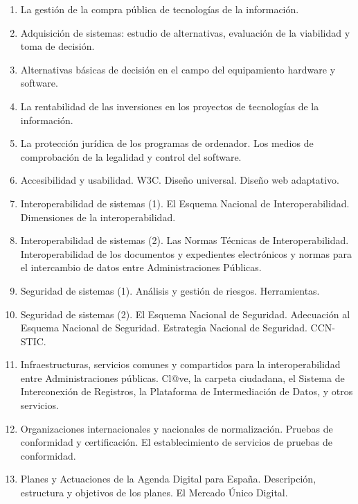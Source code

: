 \begin{enumerate}
		\item La gestión de la compra pública de tecnologías de la información.
		\item Adquisición de sistemas: estudio de alternativas, evaluación de la viabilidad y toma de decisión.
		\item Alternativas básicas de decisión en el campo del equipamiento hardware y software.
		\item La rentabilidad de las inversiones en los proyectos de tecnologías de la información.
		\item La protección jurídica de los programas de ordenador. Los medios de comprobación de la legalidad y control del software.
		\item Accesibilidad y usabilidad. W3C. Diseño universal. Diseño web adaptativo. 
		\item Interoperabilidad de sistemas (1). El Esquema Nacional de Interoperabilidad. Dimensiones de la interoperabilidad.
		\item Interoperabilidad de sistemas (2). Las Normas Técnicas de Interoperabilidad. Interoperabilidad de los documentos y expedientes electrónicos y normas para el intercambio de datos entre Administraciones Públicas.
		\item Seguridad de sistemas (1). Análisis y gestión de riesgos. Herramientas.
		\item Seguridad de sistemas (2). El Esquema Nacional de Seguridad. Adecuación al Esquema Nacional de Seguridad. Estrategia Nacional de Seguridad. CCN-STIC.
		\item Infraestructuras, servicios comunes y compartidos para la interoperabilidad entre Administraciones públicas. Cl@ve, la carpeta ciudadana, el Sistema de Interconexión de Registros, la Plataforma de Intermediación de Datos, y otros servicios.
		\item Organizaciones internacionales y nacionales de normalización. Pruebas de conformidad y certificación. El establecimiento de servicios de pruebas de conformidad.
		\item Planes y Actuaciones de la Agenda Digital para España. Descripción, estructura y objetivos de los planes. El Mercado Único Digital.
	\end{enumerate}
